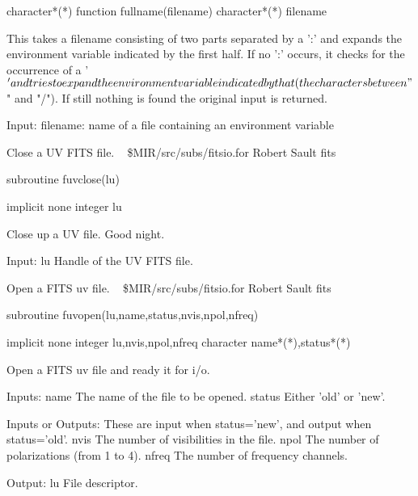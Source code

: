\par{\tenpoint
{\eightpoint\begintt
      character*(*) function fullname(filename)
      character*(*) filename

 This takes a filename consisting of two parts separated by a ':' and expands
 the environment variable indicated by the first half. If no ':' occurs, it
 checks for the occurrence of a '$' and tries to expand the environment
 variable indicated by that (the characters between "$" and "/"). If still
 nothing is found the original input is returned.

 Input:
   filename:    name of a file containing an environment variable
\endtt}
\par}
%
\noindent Close a UV FITS file.
\newline \ 
\newline {} \$MIR/src/subs/fitsio.for
\newline {} Robert Sault
\newline {} fits
\par{\tenpoint
{\eightpoint\begintt
        subroutine fuvclose(lu)

        implicit none
        integer lu

  Close up a UV file. Good night.

  Input:
    lu         Handle of the UV FITS file.
\endtt}
\par}
%
\noindent Open a FITS uv file.
\newline \ 
\newline {} \$MIR/src/subs/fitsio.for
\newline {} Robert Sault
\newline \abox{Keywords:} fits
\par{\tenpoint
{\eightpoint\begintt
        subroutine fuvopen(lu,name,status,nvis,npol,nfreq)

        implicit none
        integer lu,nvis,npol,nfreq
        character name*(*),status*(*)

  Open a FITS uv file and ready it for i/o.

  Inputs:
    name       The name of the file to be opened.
    status     Either 'old' or 'new'.

  Inputs or Outputs:
    These are input when status='new', and output when status='old'.
    nvis       The number of visibilities in the file.
    npol       The number of polarizations (from 1 to 4).
    nfreq      The number of frequency channels.

  Output:
    lu         File descriptor.
\endtt}
\par}

